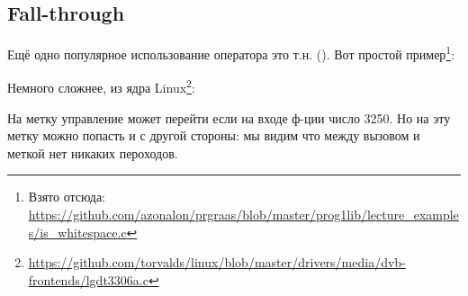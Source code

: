 ﻿\subsection{Fall-through}

Ещё одно популярное использование оператора  это т.н.  ().
Вот простой пример\footnote{Взято отсюда: \url{https://github.com/azonalon/prgraas/blob/master/prog1lib/lecture_examples/is_whitespace.c}}:



Немного сложнее, из ядра Linux\footnote{\url{https://github.com/torvalds/linux/blob/master/drivers/media/dvb-frontends/lgdt3306a.c}}:





На метку  управление может перейти если на входе ф-ции число 3250.
Но на эту метку можно попасть и с другой стороны:
мы видим что между вызовом \printf и меткой  нет никаких пероходов.

